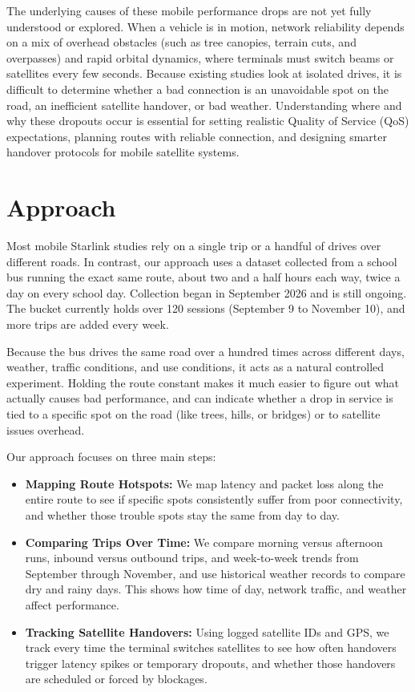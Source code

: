 \documentclass{article}
\begin{document}
The underlying causes of these mobile performance drops are not yet fully understood or explored. When a vehicle is in motion, network reliability depends on a mix of overhead obstacles (such as tree canopies, terrain cuts, and overpasses) and rapid orbital dynamics, where terminals must switch beams or satellites every few seconds. Because existing studies look at isolated drives, it is difficult to determine whether a bad connection is an unavoidable spot on the road, an inefficient satellite handover, or bad weather. Understanding where and why these dropouts occur is essential for setting realistic Quality of Service (QoS) expectations, planning routes with reliable connection, and designing smarter handover protocols for mobile satellite systems.


\section{Approach}
\label{sec:approach}

Most mobile Starlink studies rely on a single trip or a handful of drives over different roads. In contrast, our approach uses a dataset collected from a school bus running the exact same route, about two and a half hours each way, twice a day on every school day. Collection began in September 2026 and is still ongoing. The bucket currently holds over 120 sessions (September 9 to November 10), and more trips are added every week.

Because the bus drives the same road over a hundred times across different days, weather, traffic conditions, and use conditions, it acts as a natural controlled experiment. Holding the route constant makes it much easier to figure out what actually causes bad performance, and can indicate whether a drop in service is tied to a specific spot on the road (like trees, hills, or bridges) or to satellite issues overhead.

Our approach focuses on three main steps:

\begin{itemize}
    \item \textbf{Mapping Route Hotspots:} We map latency and packet loss along the entire route to see if specific spots consistently suffer from poor connectivity, and whether those trouble spots stay the same from day to day.
    
    \item \textbf{Comparing Trips Over Time:} We compare morning versus afternoon runs, inbound versus outbound trips, and week-to-week trends from September through November, and use historical weather records to compare dry and rainy days. This shows how time of day, network traffic, and weather affect performance.
    
    \item \textbf{Tracking Satellite Handovers:} Using logged satellite IDs and GPS, we track every time the terminal switches satellites to see how often handovers trigger latency spikes or temporary dropouts, and whether those handovers are scheduled or forced by blockages.
\end{itemize}
\end{document}
